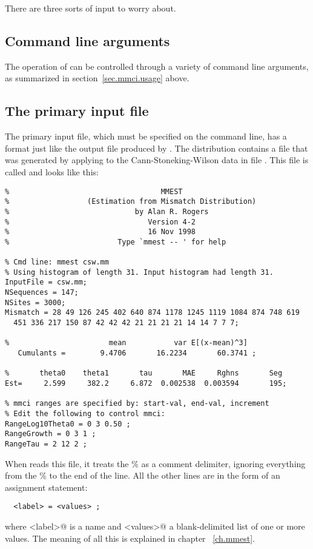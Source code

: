 There are three sorts of input to worry about.  

\subsection{Command line arguments}

The operation of  can be controlled through a variety of
command line arguments, as summarized in section~\ref{sec.mmci.usage}
above.

\subsection{The primary input file}

The primary input file, which must be specified on the command line,
has a format just like the output file produced by .  The
distribution contains a file that was generated
by applying  to the Cann-Stoneking-Wilson data in file
.  This file is called  and looks like this:
\begin{verbatim}
%                                   MMEST
%                  (Estimation from Mismatch Distribution)
%                             by Alan R. Rogers
%                                Version 4-2
%                                16 Nov 1998
%                         Type `mmest -- ' for help

% Cmd line: mmest csw.mm
% Using histogram of length 31. Input histogram had length 31.
InputFile = csw.mm;
NSequences = 147;
NSites = 3000;
Mismatch = 28 49 126 245 402 640 874 1178 1245 1119 1084 874 748 619
  451 336 217 150 87 42 42 42 21 21 21 21 14 14 7 7 7;

%                       mean           var E[(x-mean)^3]
   Cumulants =        9.4706       16.2234       60.3741 ;

%       theta0    theta1       tau       MAE     Rghns       Seg
Est=     2.599     382.2     6.872  0.002538  0.003594       195;

% mmci ranges are specified by: start-val, end-val, increment
% Edit the following to control mmci:
RangeLog10Theta0 = 0 3 0.50 ;
RangeGrowth = 0 3 1 ;
RangeTau = 2 12 2 ;
\end{verbatim}
When  reads this file, it treats the \%{} as a comment
delimiter, ignoring everything from the \%{} to the end of the line.
All the other lines are in the form of an assignment statement:
\begin{verbatim}
  <label> = <values> ;
\end{verbatim}
where \verb@<label>@ is a name and \verb@<values>@ a blank-delimited
list of one or more values.  The meaning of all this is explained in
chapter ~\ref{ch.mmest}.

